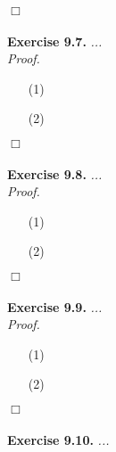 \documentclass{article}
\begin{document}
$\Box$ \\\\






\textbf{Exercise 9.7.}
\emph{...} \\

\emph{Proof.}
\begin{enumerate}
\item[(1)]
\item[(2)]

\end{enumerate}
$\Box$ \\\\






\textbf{Exercise 9.8.}
\emph{...} \\

\emph{Proof.}
\begin{enumerate}
\item[(1)]
\item[(2)]

\end{enumerate}
$\Box$ \\\\






\textbf{Exercise 9.9.}
\emph{...} \\

\emph{Proof.}
\begin{enumerate}
\item[(1)]
\item[(2)]

\end{enumerate}
$\Box$ \\\\






\textbf{Exercise 9.10.}
\emph{...} \\
\end{document}
